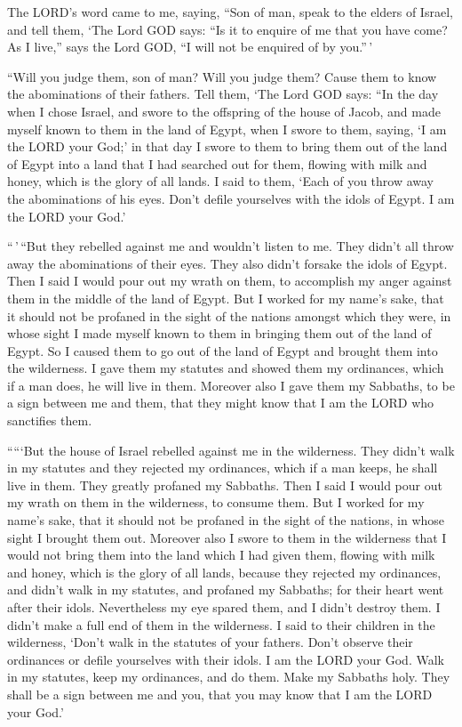  The LORD's word came to me, saying,  ``Son
of man, speak to the elders of Israel, and tell them, `The Lord GOD
says: ``Is it to enquire of me that you have come? As I live,'' says the
Lord GOD, ``I will not be enquired of by you.''\,'

 ``Will you judge them, son of man? Will you judge them?
Cause them to know the abominations of their fathers. 
Tell them, `The Lord GOD says: ``In the day when I chose Israel, and
swore to the offspring of the house of Jacob, and made myself known to
them in the land of Egypt, when I swore to them, saying, `I am the LORD
your God;'  in that day I swore to them to bring them out
of the land of Egypt into a land that I had searched out for them,
flowing with milk and honey, which is the glory of all lands.
 I said to them, `Each of you throw away the abominations
of his eyes. Don't defile yourselves with the idols of Egypt. I am the
LORD your God.'

 ``\,'\,``But they rebelled against me and wouldn't listen
to me. They didn't all throw away the abominations of their eyes. They
also didn't forsake the idols of Egypt. Then I said I would pour out my
wrath on them, to accomplish my anger against them in the middle of the
land of Egypt.  But I worked for my name's sake, that it
should not be profaned in the sight of the nations amongst which they
were, in whose sight I made myself known to them in bringing them out of
the land of Egypt.  So I caused them to go out of the
land of Egypt and brought them into the wilderness.  I
gave them my statutes and showed them my ordinances, which if a man
does, he will live in them.  Moreover also I gave them my
Sabbaths, to be a sign between me and them, that they might know that I
am the LORD who sanctifies them.

 `````But the house of Israel rebelled against me in the
wilderness. They didn't walk in my statutes and they rejected my
ordinances, which if a man keeps, he shall live in them. They greatly
profaned my Sabbaths. Then I said I would pour out my wrath on them in
the wilderness, to consume them.  But I worked for my
name's sake, that it should not be profaned in the sight of the nations,
in whose sight I brought them out.  Moreover also I swore
to them in the wilderness that I would not bring them into the land
which I had given them, flowing with milk and honey, which is the glory
of all lands,  because they rejected my ordinances, and
didn't walk in my statutes, and profaned my Sabbaths; for their heart
went after their idols.  Nevertheless my eye spared them,
and I didn't destroy them. I didn't make a full end of them in the
wilderness.  I said to their children in the wilderness,
`Don't walk in the statutes of your fathers. Don't observe their
ordinances or defile yourselves with their idols.  I am
the LORD your God. Walk in my statutes, keep my ordinances, and do them.
 Make my Sabbaths holy. They shall be a sign between me
and you, that you may know that I am the LORD your God.'

